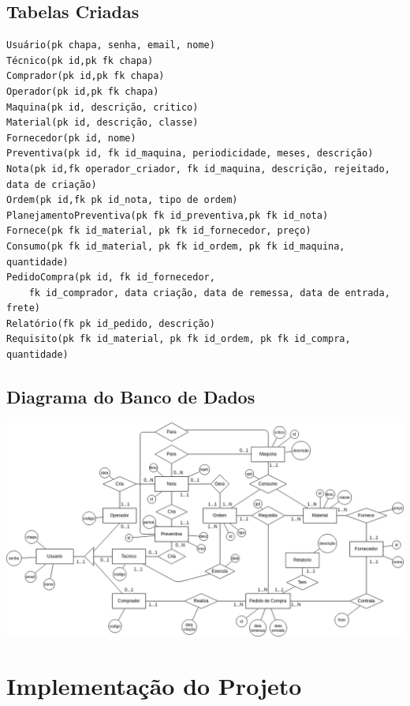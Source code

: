 \documentclass[a4paper,11pt]{article}
\begin{document}
\pagebreak

\subsection{Tabelas Criadas}
\begin{FlushLeft}
    \begin{verbatim}
Usuário(pk chapa, senha, email, nome) 
Técnico(pk id,pk fk chapa)
Comprador(pk id,pk fk chapa)
Operador(pk id,pk fk chapa)
Maquina(pk id, descrição, critico)
Material(pk id, descrição, classe)
Fornecedor(pk id, nome)
Preventiva(pk id, fk id_maquina, periodicidade, meses, descrição)
Nota(pk id,fk operador_criador, fk id_maquina, descrição, rejeitado, data de criação)
Ordem(pk id,fk pk id_nota, tipo de ordem)
PlanejamentoPreventiva(pk fk id_preventiva,pk fk id_nota)
Fornece(pk fk id_material, pk fk id_fornecedor, preço)
Consumo(pk fk id_material, pk fk id_ordem, pk fk id_maquina, quantidade)
PedidoCompra(pk id, fk id_fornecedor, 
    fk id_comprador, data criação, data de remessa, data de entrada, frete)
Relatório(fk pk id_pedido, descrição)
Requisito(pk fk id_material, pk fk id_ordem, pk fk id_compra, quantidade)
\end{verbatim}
\end{FlushLeft}

\subsection{Diagrama do Banco de Dados}

\includegraphics[width=\textwidth]{diagram}


\pagebreak

\section{Implementação do Projeto}
\end{document}
